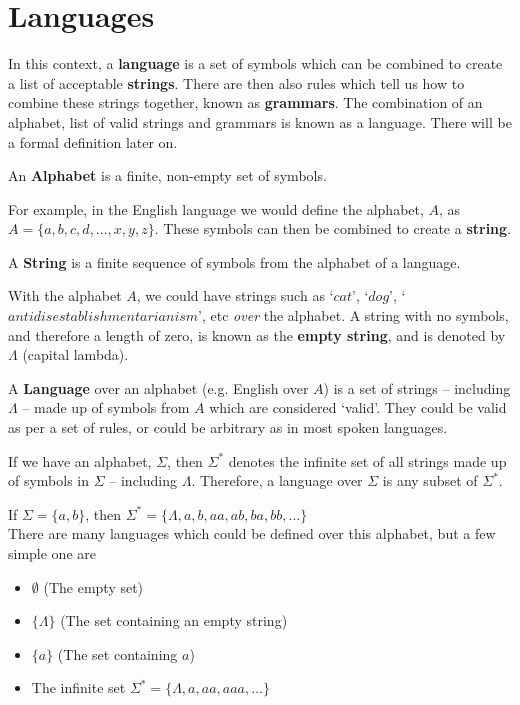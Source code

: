 
\section*{Languages}

In this context, a \textbf{language} is a set of symbols which can be combined to create a list of acceptable \textbf{strings}.
 There are then also rules which tell us how to combine these strings together, known as \textbf{grammars}. The 
 combination of an alphabet, list of valid strings and grammars is known as a language. There will be a formal definition
 later on.

\begin{definition*}{}{}
  An \textbf{Alphabet} is a finite, non-empty set of symbols.
\end{definition*}

For example, in the English language we would define the alphabet, $A$, as $A = \{a, b, c, d, \ldots, x, y, z\}$. These
 symbols can then be combined to create a \textbf{string}.

\begin{definition*}{}{}
  A \textbf{String} is a finite sequence of symbols from the alphabet of a language.
\end{definition*}

With the alphabet $A$, we could have strings such as `$cat$', `$dog$', `$antidisestablishmentarianism$', etc \textit{over} the
 alphabet. A string with no symbols, and therefore a length of zero, is known as the \textbf{empty string}, and is
 denoted by $\Lambda$ (capital lambda).

\begin{definition*}{}{}
  A \textbf{Language} over an alphabet (e.g. English over $A$) is a set of strings -- including $\Lambda$ -- made up of
   symbols from $A$ which are considered `valid'. They could be valid as per a set of rules, or could be arbitrary as
   in most spoken languages.
\end{definition*}

If we have an alphabet, $\Sigma$, then $\Sigma^*$ denotes the infinite set of all strings made up of symbols in $\Sigma$
 -- including $\Lambda$. Therefore, a language over $\Sigma$ is any subset of $\Sigma^*$.

\begin{example*}{}{}
  If $\Sigma = \{a, b\}$, then $\Sigma^* = \{\Lambda, a, b, aa, ab, ba, bb, \ldots\}$\\
  There are many languages which could be defined over this alphabet, but a few simple one are
  \begin{itemize}
    \item $\emptyset$ (The empty set)
    \item $\{\Lambda\}$ (The set containing an empty string)
    \item $\{a\}$ (The set containing $a$)
    \item The infinite set $\Sigma^* = \{\Lambda, a, aa, aaa, \ldots\}$
  \end{itemize}
\end{example*}

